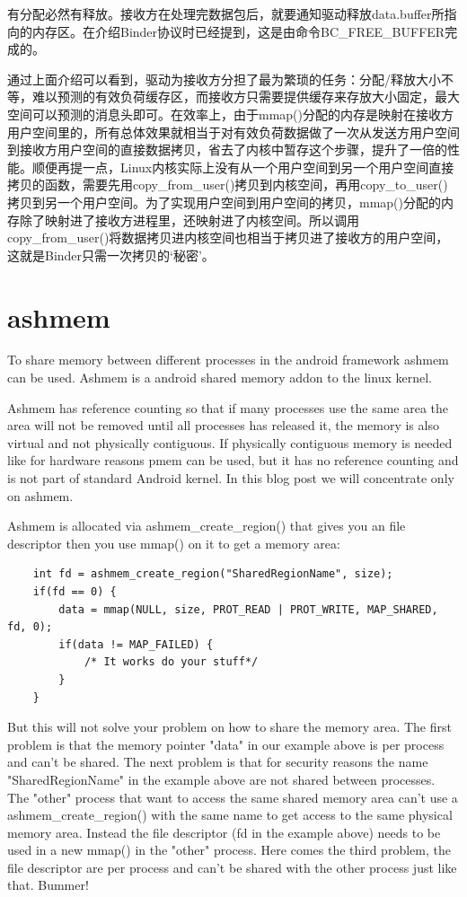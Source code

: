 \documentclass[a4paper,11pt]{article}
\begin{document}
有分配必然有释放。接收方在处理完数据包后，就要通知驱动释放data.buffer所指向的内存区。在介绍Binder协议时已经提到，这是由命令BC_FREE_BUFFER完成的。

通过上面介绍可以看到，驱动为接收方分担了最为繁琐的任务：分配/释放大小不等，难以预测的有效负荷缓存区，而接收方只需要提供缓存来存放大小固定，最大空间可以预测的消息头即可。在效率上，由于mmap()分配的内存是映射在接收方用户空间里的，所有总体效果就相当于对有效负荷数据做了一次从发送方用户空间到接收方用户空间的直接数据拷贝，省去了内核中暂存这个步骤，提升了一倍的性能。顺便再提一点，Linux内核实际上没有从一个用户空间到另一个用户空间直接拷贝的函数，需要先用copy_from_user()拷贝到内核空间，再用copy_to_user()拷贝到另一个用户空间。为了实现用户空间到用户空间的拷贝，mmap()分配的内存除了映射进了接收方进程里，还映射进了内核空间。所以调用copy_from_user()将数据拷贝进内核空间也相当于拷贝进了接收方的用户空间，这就是Binder只需一次拷贝的‘秘密’。


\section{ashmem}
To share memory between different processes in the android framework ashmem
can be used. Ashmem is a android shared memory addon to the linux kernel. 

Ashmem has reference counting so that if many processes use the same area the
area will not be removed until all processes has released it, the memory is
also virtual and not physically contiguous. If physically contiguous memory is
needed like for hardware reasons pmem can be used, but it has no reference
counting and is not part of standard Android kernel. 
In this blog post we will concentrate only on ashmem.

Ashmem is allocated via ashmem_create_region() that gives you an file
descriptor then you use mmap() on it to get a memory area:
\begin{lstlisting}
    int fd = ashmem_create_region("SharedRegionName", size);
    if(fd == 0) {
        data = mmap(NULL, size, PROT_READ | PROT_WRITE, MAP_SHARED, fd, 0);
        if(data != MAP_FAILED) {
            /* It works do your stuff*/
        }
    }
\end{lstlisting}

But this will not solve your problem on how to share the memory area. The
first problem is that the memory pointer "data" in our example above is per
process and can't be shared. The next problem is that for security reasons the
name "SharedRegionName" in the example above are not shared between processes.
The "other" process that want to access the same shared memory area can't use
a ashmem_create_region() with the same name to get access to the same physical
memory area. Instead the file descriptor (fd in the example above) needs to be
used in a new mmap() in the "other" process. Here comes the third problem, the
file descriptor are per process and can't be shared with the other process
just like that. Bummer!
\end{document}
